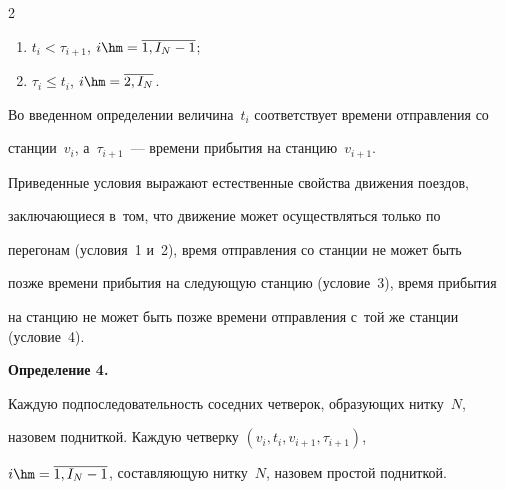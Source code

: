 \begin{multicols}{2}
\begin{enumerate}[(1)]
        $(v_{i}, v_{i+1}) \in A$, $i \hm= \overline{1, I_N-1}$;





    \item


        $t_i < \tau_{i+1}$, $i\hm = \overline{1, I_N -1}$;





    \item


        $\tau_{i} \leqslant t_{i} $, $i \hm= \overline{2,I_N}$.


        


    \end{enumerate}











Во введенном определении величина~$t_i$ соответствует времени отправления со


 станции~$v_i$, а~$\tau_{i+1}$~--- времени прибытия на станцию~$v_{i+1}$. 


 Приведенные условия выражают естественные свойства движения поездов, 


 заключающиеся в~том, что движение может осуществляться только по 


 перегонам (условия~1 и~2), время отправления со станции не может быть 


 позже времени прибытия на следующую станцию (условие~3), время прибытия 


 на станцию не может быть позже времени отправления с~той же станции (условие~4).





\smallskip





\noindent


\textbf{Определение 4.}\


    Каждую подпоследовательность соседних четверок, образующих нитку~$N$, 


    назовем подниткой. Каждую четверку $(v_i, t_i, v_{i+1}, \tau_{i+1})$, 


    $i\hm=\overline{1, I_N-1}$, составляющую нитку~$N$, назовем прос\-той подниткой.






\end{multicols}
